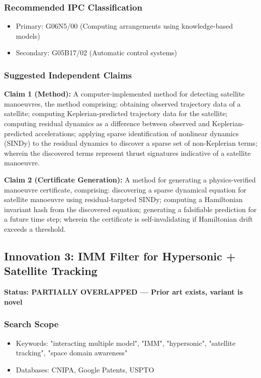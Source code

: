 \documentclass[11pt,a4paper]{article}
\begin{document}
\subsubsection*{Recommended IPC Classification}
\begin{itemize}
\item Primary: G06N5/00 (Computing arrangements using knowledge-based models)
\item Secondary: G05B17/02 (Automatic control systems)
\end{itemize}

\subsubsection*{Suggested Independent Claims}

\textbf{Claim 1 (Method):} A computer-implemented method for detecting satellite manoeuvres, the method comprising: obtaining observed trajectory data of a satellite; computing Keplerian-predicted trajectory data for the satellite; computing residual dynamics as a difference between observed and Keplerian-predicted accelerations; applying sparse identification of nonlinear dynamics (SINDy) to the residual dynamics to discover a sparse set of non-Keplerian terms; wherein the discovered terms represent thrust signatures indicative of a satellite manoeuvre.

\textbf{Claim 2 (Certificate Generation):} A method for generating a physics-verified manoeuvre certificate, comprising: discovering a sparse dynamical equation for satellite manoeuvre using residual-targeted SINDy; computing a Hamiltonian invariant hash from the discovered equation; generating a falsifiable prediction for a future time step; wherein the certificate is self-invalidating if Hamiltonian drift exceeds a threshold.

\newpage

\subsection{Innovation 3: IMM Filter for Hypersonic + Satellite Tracking}

\textbf{Status: \textcolor{attyellow}{PARTIALLY OVERLAPPED — Prior art exists, variant is novel}}

\subsubsection*{Search Scope}
\begin{itemize}
\item Keywords: "interacting multiple model", "IMM", "hypersonic", "satellite tracking", "space domain awareness"
\item Databases: CNIPA, Google Patents, USPTO
\end{itemize}
\end{document}
